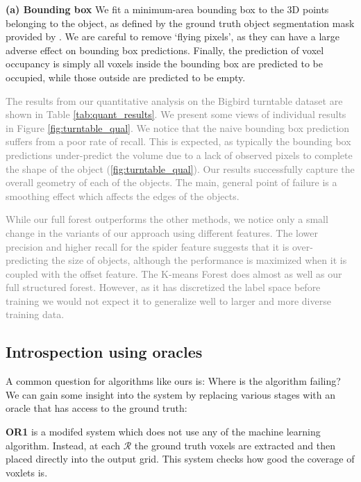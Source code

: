 \documentclass[10pt,twocolumn,letterpaper]{article}
\newcommand{\remove}[1]{\textcolor{grey}{#1}}
\begin{document}
\noindent \textbf{(a) Bounding box} We fit a minimum-area bounding box to the 3D points belonging to the object, as defined by the ground truth object segmentation mask provided by \cite{singh-icra-2014}.
We are careful to remove `flying pixels', as they can have a large adverse effect on bounding box predictions.
Finally, the prediction of voxel occupancy is simply all voxels inside the bounding box are predicted to be occupied, while those outside are predicted to be empty.

\remove{The results from our quantitative analysis on the Bigbird turntable dataset are shown in Table \ref{tab:quant_results}.
We present some views of individual results in Figure \ref{fig:turntable_qual}.
We notice that the naive bounding box prediction suffers from a poor rate of recall.
This is expected, as typically the bounding box predictions under-predict the volume due to a lack of observed pixels to complete the shape of the object (\ref{fig:turntable_qual}).
Our results successfully capture the overall geometry of each of the objects.
The main, general point of failure is a smoothing effect which affects the edges of the objects.}

\remove{While our full forest outperforms the other methods, we notice only a small change in the variants of our approach using different features.
The lower precision and higher recall for the spider feature suggests that it is over-predicting the size of objects, although the performance is maximized when it is coupled with the offset feature.
The K-means Forest does almost as well as our full structured forest.
However, as it has discretized the label space before training we would not expect it to generalize well to larger and more diverse training data.}

\subsection{Introspection using oracles}
\label{sec:oracles}

A common question for algorithms like ours is: Where is the algorithm failing? We can gain some insight into the system by replacing various stages with an oracle that has access to the ground truth:

\textbf{OR1} is a modifed system which does not use any of the machine learning algorithm. Instead, at each $\mathcal{R}$ the ground truth voxels are extracted and then placed directly into the output grid. This system checks how good the coverage of voxlets is.
\end{document}

